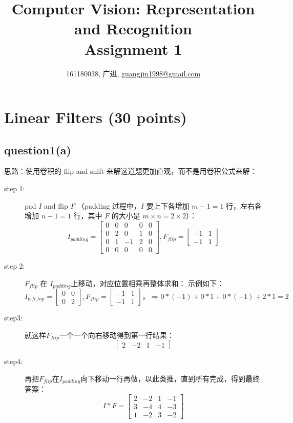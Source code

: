 \documentclass[a4paper,UTF8]{article}
\numberwithin{equation}{section}
\begin{document}
\title{Computer Vision: Representation and Recognition\\
Assignment 1}
\author{161180038, 广进, \href{mailto:guangjin1998@gmail.com}{guangjin1998@gmail.com}}
\maketitle

\section{Linear Filters (30 points)}
\subsection{question1(a)}
思路：使用卷积的 flip and shift 来解这道题更加直观，而不是用卷积公式来解：
\begin{description}
\item[step 1:]pad $I$ and flip $F$ （padding 过程中，$I$ 要上下各增加 $m-1=1$ 行，左右各增加 $n-1=1$ 行，其中 $F$ 的大小是 $m×n=2×2$）：
\begin{equation}
I_{padding}={
\left[ \begin{array}{ccccc}
0 & 0 & 0 & 0 & 0\\
0 & 2 & 0 & 1 & 0\\
0 & 1 & -1 & 2 & 0\\
0 & 0 & 0 & 0 & 0
\end{array} 
\right ]},
F_{flip}={
\left[ \begin{array}{cc}
-1&1\\
-1&1
\end{array}
\right ]}
\end{equation}
\item[step 2:] $F_{flip}$ 在 $I_{padding}$上移动，对应位置相乘再整体求和：
示例如下：
\begin{equation}
I_{left\_top}={
\left[ \begin{array}{cc}
0 & 0 \\
0 & 2
\end{array} 
\right ]},
F_{flip}={
\left[ \begin{array}{cc}
-1&1\\
-1&1
\end{array}
\right ]}，
\Rightarrow 0*(-1)+0*1+0*(-1)+2*1=2
\end{equation}
\item[step3:] 就这样$F_{flip}$一个一个向右移动得到第一行结果：
\begin{equation}
{
\left[ \begin{array}{cccc}
2&-2&1&-1
\end{array} 
\right ]}
\end{equation}
\item[step4:] 再把$F_{flip}$在$I_{padding}$向下移动一行再做，以此类推，直到所有完成，得到最终答案：
\begin{equation}
I*F={
\left[ \begin{array}{cccc}
2&-2&1&-1\\
3&-4&4&-3\\
1&-2&3&-2
\end{array}
\right ]}
\end{equation}
\end{description}
\end{document}
